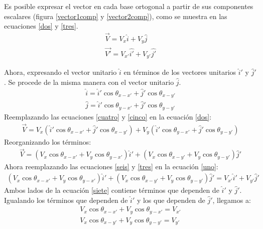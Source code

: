 \documentclass[12pt,letterpaper]{article}
\begin{document}
Es posible expresar el vector en cada base ortogonal a partir de sus componentes escalares (figura \ref{vector1comp} y \ref{vector2comp}), como se muestra en las ecuaciones \ref{dos} y \ref{tres}.
%
\begin{align}
	\overset{\rightarrow}{V} = V_x \hat{i} + V_y \hat{j} \label{dos}\\
	\overset{\rightarrow}{V'} = V_{x'} \hat{i'} + V_{y'} \hat{j'} \label{tres}
\end{align}

Ahora, expresando el vector unitario $\hat{i}$ en términos de los vectores unitarios $\hat{i}'$ y $\hat{j}'$. Se procede de la misma manera con el vector unitario $\hat{j}$.
%
\begin{align}
	\hat{i} = \hat{i}' \cos \theta_{x-x'} +  \hat{j}' \cos \theta_{x-y'} \label{cuatro}\\
	\hat{j} = \hat{i}' \cos \theta_{y-x'} +  \hat{j}' \cos \theta_{y-y'} \label{cinco}
\end{align}
%
Reemplazando las ecuaciones \ref{cuatro} y \ref{cinco} en la ecuación \ref{dos}:
%
\begin{align*}
	\overset{\rightarrow}{V} = V_x \left( \hat{i}' \cos \theta_{x-x'} + \hat{j}' \cos \theta_{x-y'} \right) + V_y \left( \hat{i}' \cos \theta_{y-x'} + \hat{j}' \cos \theta_{y-y'} \right)
\end{align*}
%
Reorganizando los términos:
%
\begin{align}
	\overset{\rightarrow}{V} = \left( V_x \cos \theta_{x-x'} + V_y \cos \theta_{y-x'} \right) \hat{i}'+ \left( V_x \cos \theta_{x-y'} + V_y \cos \theta_{y-y'} \right) \hat{j}' \label{seis}
\end{align}
%
Ahora reemplazando las ecuaciones \ref{seis} y \ref{tres} en la ecuación \ref{uno}:
%
\begin{align}
	\left( V_x \cos \theta_{x-x'} + V_y \cos \theta_{y-x'} \right) \hat{i}'+ \left( V_x \cos \theta_{x-y'} + V_y \cos \theta_{y-y'} \right) \hat{j}' = V_{x'} \hat{i}' + V_{y'} \hat{j}' \label{siete}
\end{align}
%
Ambos lados de la ecuación \ref{siete} contiene términos que dependen de $\hat{i}'$
y $\hat{j}'$. Igualando los términos que dependen de $\hat{i}'$ y los que dependen de $\hat{j}'$, llegamos a:
%
\begin{align}
	V_x \cos \theta_{x-x'} + V_y \cos \theta_{y-x'} = V_{x'} \label{ocho}\\
	V_x \cos \theta_{x-y'} + V_y \cos \theta_{y-y'} = V_{y'} \label{nueve}
\end{align}
\end{document}
